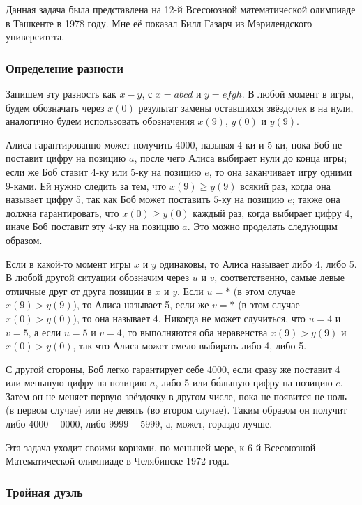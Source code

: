 Данная задача была представлена на 12-й Всесоюзной математической олимпиаде в Ташкенте в 1978 году.
Мне её показал Билл Газарч из Мэрилендского университета.%

\subsubsection*{Определение разности}%

Запишем эту разность как $x-y$, с $x=abcd$ и $y=efgh$.
В любой момент в игры, будем обозначать через $x(0)$ результат замены оставшихся звёздочек в на нули, аналогично будем использовать обозначения $x(9)$, $y(0)$ и $y(9)$.

Алиса гарантированно может получить 4000, называя $4$-ки и $5$-ки, пока Боб не поставит цифру на позицию $a$, после чего Алиса выбирает нули до конца игры;
если же Боб ставит $4$-ку или $5$-ку на позицию $e$, то она заканчивает игру одними $9$-ками.
Ей нужно следить за тем, что $x(9)\ge y(9)$ всякий раз, когда она называет цифру 5, так как Боб может поставить $5$-ку на позицию $e$;
также она должна гарантировать, что $x(0)\ge y(0)$ каждый раз, когда выбирает цифру 4, иначе Боб поставит эту $4$-ку на позицию $a$.
Это можно проделать следующим образом.

Если в какой-то момент игры $x$ и $y$ одинаковы, то Алиса называет либо 4, либо 5.
В любой другой ситуации обозначим через $u$ и $v$, соответственно, самые левые отличные друг от друга позиции в $x$ и $y$.
Если $u=*$ (в этом случае $x(9)> y(9)$), то Алиса называет 5, если же $v=*$ (в этом случае $x(0)> y(0)$), то она называет 4.
Никогда не может случиться, что $u=4$ и $v=5$, а если $u=5$ и $v=4$, то выполняются оба неравенства $x(9)> y(9)$ и $x(0)> y(0)$, так что Алиса может смело выбирать либо 4, либо 5.

С другой стороны, Боб легко гарантирует себе 4000, если сразу же поставит 4 или меньшую цифру на позицию $a$, либо 5 или б\'{о}льшую цифру на позицию $e$.
Затем он не меняет первую звёздочку в другом числе, пока не появится не ноль (в первом случае) или не девять (во втором случае).
Таким образом он получит либо $4000-0000$, либо $9999-5999$, а, может, гораздо лучше.
\heart

Эта задача уходит своими корнями, по меньшей мере, к 6-й Всесоюзной Математической олимпиаде в Челябинске 1972 года.

\subsubsection*{Тройная дуэль}%

